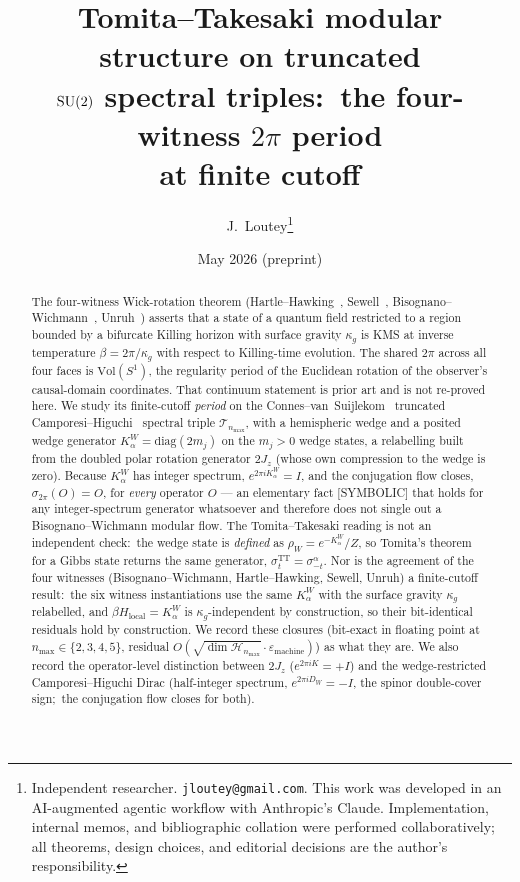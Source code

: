 \documentclass[11pt,a4paper]{article}
\title{Tomita--Takesaki modular structure on truncated\\
$\mathrm{SU}(2)$ spectral triples:\ the four-witness $2\pi$ period\\
at finite cutoff}
\author{J.~Loutey\thanks{Independent researcher. \texttt{jloutey@gmail.com}.
This work was developed in an AI-augmented agentic workflow with
Anthropic's Claude. Implementation, internal memos, and bibliographic
collation were performed collaboratively; all theorems, design choices,
and editorial decisions are the author's responsibility.}}
\date{May 2026 (preprint)}
\theoremstyle{plain}
\theoremstyle{definition}
\newcommand{\nmax}{n_{\max}}
\newcommand{\Hilb}{\mathcal{H}}
\newcommand{\Tcal}{\mathcal{T}}
\newcommand{\Vol}{\mathrm{Vol}}
\newcommand{\TT}{\mathrm{TT}}
\begin{document}
\maketitle

\begin{abstract}
The four-witness Wick-rotation theorem
(Hartle--Hawking~\cite{hartle_hawking1976}, Sewell~\cite{sewell1982},
Bisognano--Wichmann~\cite{bisognano_wichmann1976},
Unruh~\cite{unruh1976}) asserts that a state of a quantum field
restricted to a region bounded by a bifurcate Killing horizon with
surface gravity $\kappa_g$ is KMS at inverse temperature
$\beta = 2\pi/\kappa_g$ with respect to Killing-time evolution. The
shared $2\pi$ across all four faces is $\Vol(S^1)$, the regularity
period of the Euclidean rotation of the observer's causal-domain
coordinates. That continuum statement is prior art and is not
re-proved here. We study its finite-cutoff \emph{period} on the
Connes--van~Suijlekom~\cite{connes_vs2021} truncated
Camporesi--Higuchi~\cite{camporesi_higuchi1996} spectral triple
$\Tcal_{\nmax}$, with a hemispheric wedge and a posited wedge generator
$K_\alpha^W = \mathrm{diag}(2m_j)$ on the $m_j > 0$ wedge states, a
relabelling built from the doubled polar rotation generator $2J_z$ (whose
own compression to the wedge is zero). Because $K_\alpha^W$ has integer
spectrum, $e^{2\pi i K_\alpha^W} = I$, and the conjugation flow closes,
$\sigma_{2\pi}(O) = O$, for \emph{every} operator $O$ --- an elementary
fact [SYMBOLIC] that holds for any integer-spectrum generator
whatsoever and therefore does not single out a Bisognano--Wichmann
modular flow. The Tomita--Takesaki reading is not an independent
check:\ the wedge state is \emph{defined} as
$\rho_W = e^{-K_\alpha^W}/Z$, so Tomita's theorem for a Gibbs state
returns the same generator, $\sigma_t^{\TT} = \sigma_{-t}^{\alpha}$.
Nor is the agreement of the four witnesses (Bisognano--Wichmann,
Hartle--Hawking, Sewell, Unruh) a finite-cutoff result:\ the six
witness instantiations use the same $K_\alpha^W$ with the surface
gravity $\kappa_g$ relabelled, and $\beta H_{\mathrm{local}} =
K_\alpha^W$ is $\kappa_g$-independent by construction, so their
bit-identical residuals hold by construction. We record these closures
(bit-exact in floating point at $\nmax \in \{2, 3, 4, 5\}$, residual
$O(\sqrt{\dim \Hilb_{\nmax}} \cdot \varepsilon_{\mathrm{machine}})$) as
what they are. We also record the operator-level distinction between
$2J_z$ ($e^{2\pi i K} = +I$) and the wedge-restricted
Camporesi--Higuchi Dirac (half-integer spectrum, $e^{2\pi i D_W} = -I$,
the spinor double-cover sign;\ the conjugation flow closes for both).

\end{abstract}
\end{document}
